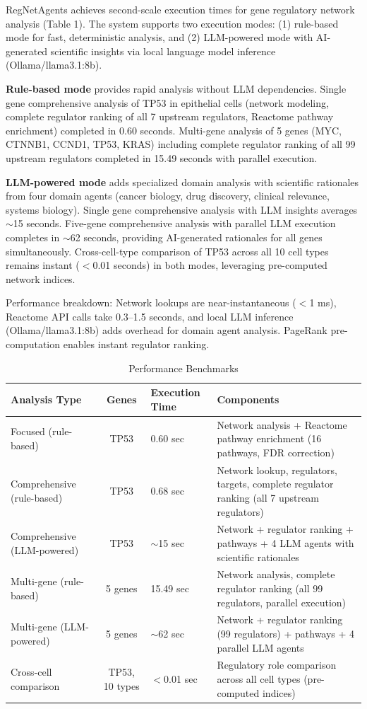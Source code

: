 \documentclass[11pt]{article}
\begin{document}
RegNetAgents achieves second-scale execution times for gene regulatory network analysis (Table 1). The system supports two execution modes: (1) rule-based mode for fast, deterministic analysis, and (2) LLM-powered mode with AI-generated scientific insights via local language model inference (Ollama/llama3.1:8b).

\textbf{Rule-based mode} provides rapid analysis without LLM dependencies. Single gene comprehensive analysis of TP53 in epithelial cells (network modeling, complete regulator ranking of all 7 upstream regulators, Reactome pathway enrichment) completed in 0.60 seconds. Multi-gene analysis of 5 genes (MYC, CTNNB1, CCND1, TP53, KRAS) including complete regulator ranking of all 99 upstream regulators completed in 15.49 seconds with parallel execution.

\textbf{LLM-powered mode} adds specialized domain analysis with scientific rationales from four domain agents (cancer biology, drug discovery, clinical relevance, systems biology). Single gene comprehensive analysis with LLM insights averages $\sim$15 seconds. Five-gene comprehensive analysis with parallel LLM execution completes in $\sim$62 seconds, providing AI-generated rationales for all genes simultaneously. Cross-cell-type comparison of TP53 across all 10 cell types remains instant ($<$0.01 seconds) in both modes, leveraging pre-computed network indices.

Performance breakdown: Network lookups are near-instantaneous ($<$1 ms), Reactome API calls take 0.3--1.5 seconds, and local LLM inference (Ollama/llama3.1:8b) adds overhead for domain agent analysis. PageRank pre-computation enables instant regulator ranking.

\begin{table}[htbp]
\centering
\caption{Performance Benchmarks}
\begin{tabular}{p{3.5cm}cp{2.5cm}p{6cm}}
\toprule
\textbf{Analysis Type} & \textbf{Genes} & \textbf{Execution Time} & \textbf{Components} \\
\midrule
Focused (rule-based) & TP53 & 0.60 sec & Network analysis + Reactome pathway enrichment (16 pathways, FDR correction) \\
Comprehensive (rule-based) & TP53 & 0.68 sec & Network lookup, regulators, targets, complete regulator ranking (all 7 upstream regulators) \\
Comprehensive (LLM-powered) & TP53 & $\sim$15 sec & Network + regulator ranking + pathways + 4 LLM agents with scientific rationales \\
Multi-gene (rule-based) & 5 genes & 15.49 sec & Network analysis, complete regulator ranking (all 99 regulators, parallel execution) \\
Multi-gene (LLM-powered) & 5 genes & $\sim$62 sec & Network + regulator ranking (99 regulators) + pathways + 4 parallel LLM agents \\
Cross-cell comparison & TP53, 10 types & $<$0.01 sec & Regulatory role comparison across all cell types (pre-computed indices) \\
\bottomrule
\end{tabular}
\label{tab:performance}
\end{table}
\end{document}
